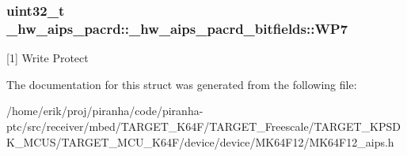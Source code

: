 \subsubsection[{\texorpdfstring{W\+P7}{WP7}}]{\setlength{\rightskip}{0pt plus 5cm}uint32\+\_\+t \+\_\+hw\+\_\+aips\+\_\+pacrd\+::\+\_\+hw\+\_\+aips\+\_\+pacrd\+\_\+bitfields\+::\+W\+P7}\hypertarget{struct__hw__aips__pacrd_1_1__hw__aips__pacrd__bitfields_a8dbc48044106877edda960848ca00dcf}{}\label{struct__hw__aips__pacrd_1_1__hw__aips__pacrd__bitfields_a8dbc48044106877edda960848ca00dcf}
\mbox{[}1\mbox{]} Write Protect 

The documentation for this struct was generated from the following file\+:\begin{DoxyCompactItemize}
\item 
/home/erik/proj/piranha/code/piranha-\/ptc/src/receiver/mbed/\+T\+A\+R\+G\+E\+T\+\_\+\+K64\+F/\+T\+A\+R\+G\+E\+T\+\_\+\+Freescale/\+T\+A\+R\+G\+E\+T\+\_\+\+K\+P\+S\+D\+K\+\_\+\+M\+C\+U\+S/\+T\+A\+R\+G\+E\+T\+\_\+\+M\+C\+U\+\_\+\+K64\+F/device/device/\+M\+K64\+F12/M\+K64\+F12\+\_\+aips.\+h\end{DoxyCompactItemize}
